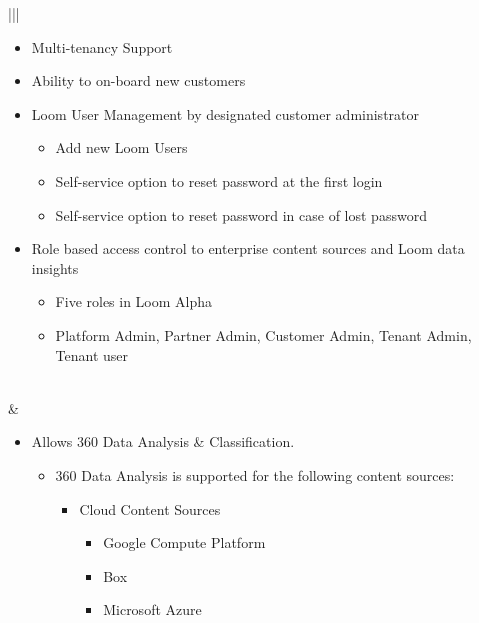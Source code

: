 \documentclass[letterpaper,10pt,english]{sphinxhowto}
\begin{document}
\begin{savenotes}
\begin{longtable}{|||}
\begin{itemize}
\begin{itemize}
\end{itemize}

\item {} 
Multi-tenancy Support

\item {} 
Ability to on-board new customers

\item {} 
Loom User Management by designated customer administrator
\begin{itemize}
\item {} 
Add new Loom Users

\item {} 
Self-service option to reset password at the first login

\item {} 
Self-service option to reset password in case of lost password

\end{itemize}

\item {} 
Role based access control to enterprise content sources and Loom data insights
\begin{itemize}
\item {} 
Five roles in Loom Alpha

\item {} 
Platform Admin, Partner Admin, Customer Admin, Tenant Admin, Tenant user

\end{itemize}

\end{itemize}
\\
\hline
{}
&
\begin{itemize}
\item {} 
Allows 360 Data Analysis \& Classification.
\begin{itemize}
\item {} 
360 Data Analysis is supported for the following content sources:
\begin{itemize}
\item {} 
Cloud Content Sources
\begin{itemize}
\item {} 
Google Compute Platform

\item {} 
Box

\item {} 
Microsoft Azure


\end{itemize}
\end{itemize}
\end{itemize}
\end{itemize}
\end{longtable}
\end{savenotes}
\end{document}
